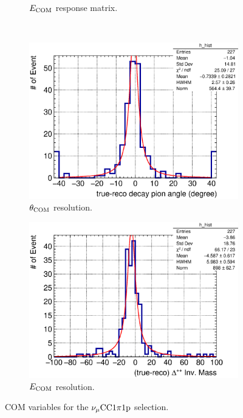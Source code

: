 \begin{figure}
\begin{subfigure}[b]{\dbfigwid\textwidth}
               \caption{$E_{\textrm{COM}}$ response matrix.}
               \label{subfig:reco-com-e-resmat}
          \end{subfigure}
          \\
          \begin{subfigure}[b]{\dbfigwid\textwidth}
               \centering
               \includegraphics[width=\textwidth]{figures/COM/SFGpTPCmu_dang_res_hist_al15.eps}
               \caption{$\theta_{\textrm{COM}}$ resolution.}
               \label{subfig:reco-com-t-res}
          \end{subfigure}
          \begin{subfigure}[b]{\dbfigwid\textwidth}
               \centering
               \includegraphics[width=\textwidth]{figures/COM/SFGpTPCmu_edelta_res_hist_al15.eps}
               \caption{$E_{\textrm{COM}}$ resolution.}
               \label{subfig:reco-com-e-res}
          \end{subfigure}
          \caption{COM variables for the $\nu_{\mu}\textrm{CC}1\pi1\textrm{p}$ selection.}
          \label{fig:com-reco}
     \end{figure}
